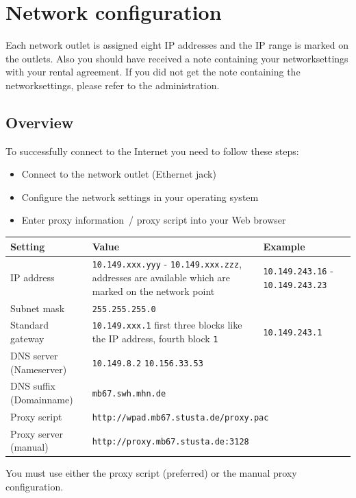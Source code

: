 \documentclass[a4paper,12pt]{scrartcl}
\begin{document}
\newpage
\section*{Network configuration}

Each network outlet is assigned eight IP addresses and the IP range is marked on the outlets. Also you should have received a note containing your networksettings with your rental agreement. If you did not get the note containing the networksettings, please refer to the administration.

\subsection*{Overview}

To successfully connect to the Internet you need to follow these steps:
\begin{itemize}
    \item Connect to the network outlet (Ethernet jack)
    \item Configure the network settings in your operating system
    \item Enter proxy information~/ proxy script into your Web browser
\end{itemize}


\begin{center}
  \begin{tabularx}{\linewidth}{|lXp{.2\linewidth}|}
    \hline
    Setting & Value & Example \\
    \hline \hline
    IP address & \nolinkurl{10.149.xxx.yyy} - \nolinkurl{10.149.xxx.zzz}, \newline 8 addresses are available which are marked on the network point & \nolinkurl{10.149.243.16} - \nolinkurl{10.149.243.23} \\
    \hline
    Subnet mask & \nolinkurl{255.255.255.0} & \\
    \hline
    Standard gateway & \nolinkurl{10.149.xxx.1} \newline first three blocks like the IP address, fourth block \nolinkurl{1} & \nolinkurl{10.149.243.1} \\
    \hline
		  DNS server (Nameserver) & \nolinkurl{10.149.8.2} \newline \nolinkurl{10.156.33.53} & \\
    \hline
    DNS suffix (Domainname) & \nolinkurl{mb67.swh.mhn.de} & \\
    \hline
    Proxy script & \multicolumn{2}{l|}{\nolinkurl{http://wpad.mb67.stusta.de/proxy.pac}} \\
    \hline
    Proxy server (manual) & \multicolumn{2}{l|}{\nolinkurl{http://proxy.mb67.stusta.de:3128}} \\
    \hline
  \end{tabularx}
\end{center}
You must use either the proxy script (preferred) or the manual proxy configuration.
\end{document}
